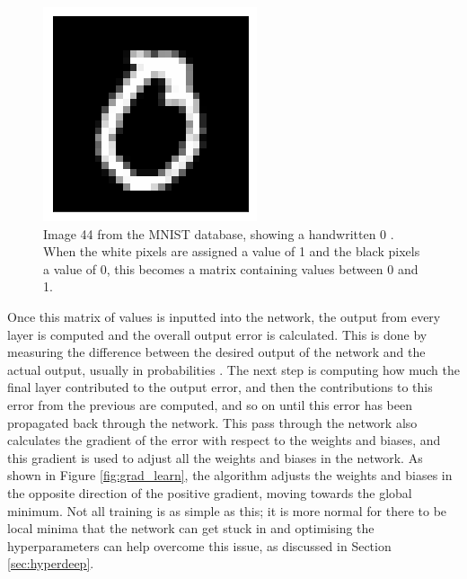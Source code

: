 \documentclass[12pt, onecolumn]{aa}
\begin{document}
\begin{figure}
    \centering
    \includegraphics[width=0.5\linewidth]{Figures/MNIST_44_0.png}
    \caption{Image 44 from the MNIST database, showing a handwritten 0 \citep{lecun-mnisthandwrittendigit-2010}. When the white pixels are assigned a value of 1 and the black pixels a value of 0, this becomes a matrix containing values between 0 and 1. }
    \label{fig:mnist_44}
\end{figure}



Once this matrix of values is inputted into the network, the output from every layer is computed and the overall output error is calculated. This is done by measuring the difference between the desired output of the network and the actual output, usually in probabilities \citep{rumelhart1986}. The next step is computing how much the final layer contributed to the output error, and then the contributions to this error from the previous are computed, and so on until this error has been propagated back through the network. This pass through the network also calculates the gradient of the error with respect to the weights and biases, and this gradient is used to adjust all the weights and biases in the network. As shown in Figure \ref{fig:grad_learn}, the algorithm adjusts the weights and biases in the opposite direction of the positive gradient, moving towards the global minimum. Not all training is as simple as this; it is more normal for there to be local minima that the network can get stuck in and optimising the hyperparameters can help overcome this issue, as discussed in Section \ref{sec:hyperdeep}.
\end{document}
